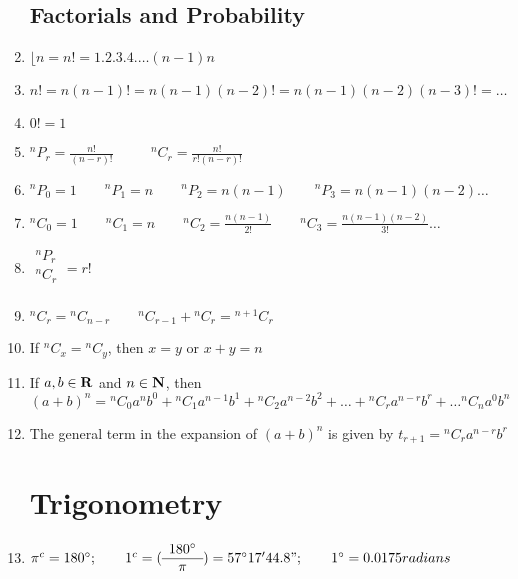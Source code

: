 \documentclass[a4paper]{article}
\begin{document}
\begin{enumerate}
\subsection{Factorials and Probability}

\item
$\lfloor n = n! = 1.2.3.4. \dots (n-1)n$

\item
$n!=n(n-1)! = n(n-1)(n-2)! = n(n-1)(n-2)(n-3)! = \dots$

\item
$0! = 1$

\item
${}^nP_r = \frac{n!}{(n-r)!} $
$\qquad$
${}^nC_r = \frac{n!}{r!(n-r)!}$

\item
${}^nP_0=1 \qquad {}^nP_1=n \qquad {}^nP_2=n(n-1) \qquad {}^nP_3=n(n-1)(n-2)\dots$

\item
${}^nC_0=1 \qquad {}^nC_1=n \qquad {}^nC_2=\frac{n(n-1)}{2!}
 \qquad {}^nC_3=\frac{n(n-1)(n-2)}{3!}\dots$

\item
$\begin{array}{c}
{}^nP_r \\
\hline
{}^nC_r \\
\end{array}
= r!$

\item
${}^nC_r = {}^nC_{n-r} \qquad
{}^nC_{r-1} +{}^nC_{r} = {}^{n+1}C_{r}$

\item
If ${}^nC_x = {}^nC_y$, then $x=y$ or $x+y=n$

\item
If $a,b \in \mathbf{R}$ and $n \in \mathbf{N}$, then
$(a+b)^n = {}^nC_0 a^n b^0 + {}^nC_1 a^{n-1} b^1 + {}^nC_2 a^{n-2} b^2 +
\dots + {}^nC_r a^{n-r} b^r + \dots
{}^nC_n a^0 b^n
$

\item
The general term in the expansion of $(a+b)^n$ is given by
$t_{r+1} = {}^nC_r a^{n-r} b^r$

\section{Trigonometry}

\item
$\pi^c = 180 ^\circ;
\qquad
1^c = (\begin{array}{c}180 ^\circ\\ \hline\pi\end{array}) 
= 57 ^\circ 17'44.8";
\qquad
1 ^\circ = 0.0175 radians
$


\end{enumerate}
\end{document}
